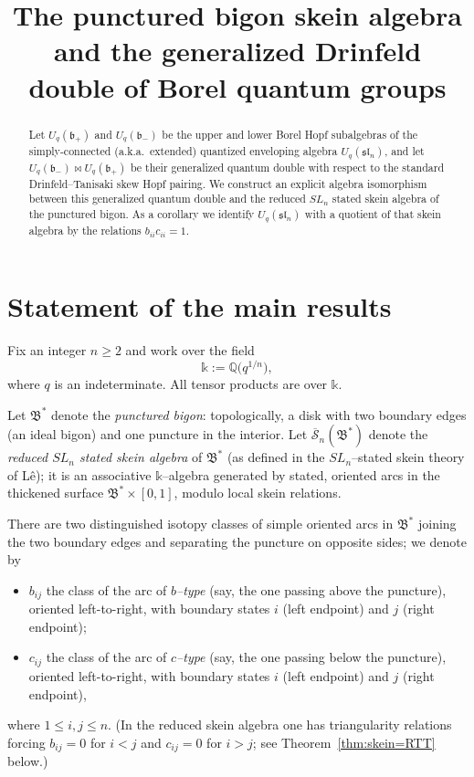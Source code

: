 \documentclass[11pt]{article}
\newcommand{\Bbbk}{\mathbb{k}}
\newcommand{\Uc}{U}
\newcommand{\sl}{\mathfrak{sl}}
\newcommand{\fb}{\mathfrak{b}}
\newcommand{\fB}{\mathfrak{B}}
\newcommand{\bcS}{\overline{\mathcal S}}
\newcommand{\bipr}{\bowtie}
\theoremstyle{plain}
\theoremstyle{definition}
\begin{document}
\title{The punctured bigon skein algebra and the generalized Drinfeld double of Borel quantum groups}
\author{}
\date{}
\maketitle

\begin{abstract}
Let $\Uc_q(\fb_+)$ and $\Uc_q(\fb_-)$ be the upper and lower Borel Hopf subalgebras of the simply-connected (a.k.a.\ extended) quantized enveloping algebra $\Uc_q(\sl_n)$, and let
$\Uc_q(\fb_-)\bipr \Uc_q(\fb_+)$ be their generalized quantum double with respect to the standard Drinfeld--Tanisaki skew Hopf pairing.
We construct an explicit algebra isomorphism between this generalized quantum double and the reduced $SL_n$ stated skein algebra of the punctured bigon.
As a corollary we identify $\Uc_q(\sl_n)$ with a quotient of that skein algebra by the relations $b_{ii}c_{ii}=1$.
\end{abstract}

\tableofcontents

\section{Statement of the main results}

Fix an integer $n\ge 2$ and work over the field
\[
\Bbbk:=\mathbb{Q}\bigl(q^{1/n}\bigr),
\]
where $q$ is an indeterminate. All tensor products are over $\Bbbk$.

Let $\fB^*$ denote the \emph{punctured bigon}: topologically, a disk with two boundary edges (an ideal bigon) and one puncture in the interior.
Let $\bcS_n(\fB^*)$ denote the \emph{reduced $SL_n$ stated skein algebra} of $\fB^*$ (as defined in the $SL_n$--stated skein theory of L\^{e}); it is an associative $\Bbbk$--algebra generated by stated, oriented arcs in the thickened surface $\fB^*\times[0,1]$, modulo local skein relations.

There are two distinguished isotopy classes of simple oriented arcs in $\fB^*$ joining the two boundary edges and separating the puncture on opposite sides; we denote by
\begin{itemize}[leftmargin=2em]
\item $b_{ij}$ the class of the arc of \emph{$b$--type} (say, the one passing above the puncture), oriented left-to-right, with boundary states $i$ (left endpoint) and $j$ (right endpoint);
\item $c_{ij}$ the class of the arc of \emph{$c$--type} (say, the one passing below the puncture), oriented left-to-right, with boundary states $i$ (left endpoint) and $j$ (right endpoint),
\end{itemize}
where $1\le i,j\le n$. (In the reduced skein algebra one has triangularity relations forcing $b_{ij}=0$ for $i<j$ and $c_{ij}=0$ for $i>j$; see Theorem~\ref{thm:skein=RTT} below.)
\end{document}

